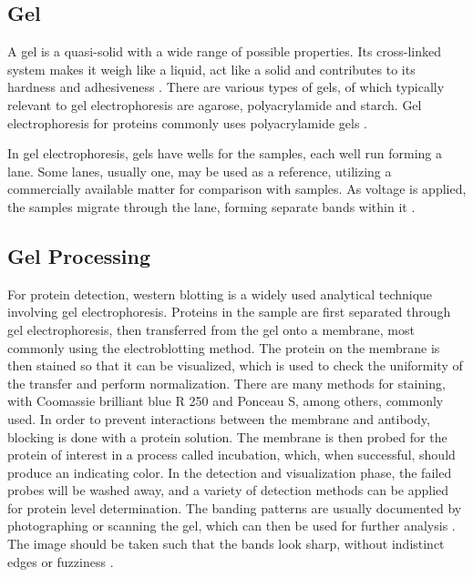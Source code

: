 \subsection{Gel}
A gel is a quasi-solid with a wide range of possible properties. Its cross-linked system makes it weigh like a liquid, act like a solid and contributes to its hardness and adhesiveness \cite{supramolecular-polymer-networks-and-gels}. There are various types of gels, of which typically relevant to gel electrophoresis are agarose, polyacrylamide and starch. Gel electrophoresis for proteins commonly uses polyacrylamide gels \cite {gel-electrophoresis-principles-basics}.

In gel electrophoresis, gels have wells for the samples, each well run forming a lane. Some lanes, usually one, may be used as a reference, utilizing a commercially available matter for comparison with samples. As voltage is applied, the samples migrate through the lane, forming separate bands within it \cite{gel-electrophoresis-principles-basics}.

\subsection{Gel Processing}

For protein detection, western blotting is a widely used analytical technique involving gel electrophoresis. Proteins in the sample are first separated through gel electrophoresis, then transferred from the gel onto a membrane, most commonly using the electroblotting method. The protein on the membrane is then stained so that it can be visualized, which is used to check the uniformity of the transfer and perform normalization. There are many methods for staining, with Coomassie brilliant blue R 250 and Ponceau S, among others, commonly used. In order to prevent interactions between the membrane and antibody, blocking is done with a protein solution. The membrane is then probed for the protein of interest in a process called incubation, which, when successful, should produce an indicating color. In the detection and visualization phase, the failed probes will be washed away, and a variety of detection methods can be applied for protein level determination. The banding patterns are usually documented by photographing or scanning the gel, which can then be used for further analysis \cite{gel-electrophoresis-principles-basics}.
The image should be taken such that the bands look sharp, without indistinct edges or fuzziness \cite{western-blotting-basics}.

